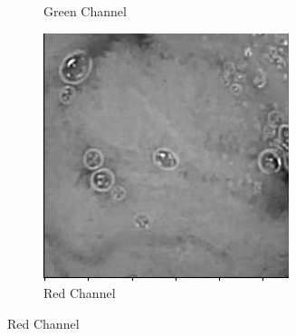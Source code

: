 \begin{figure}[H]
\begin{subfigure}[b]{0.3\textwidth}
    \caption{Green Channel}
  \end{subfigure}
  \begin{subfigure}[b]{0.3\textwidth}
    \includegraphics[width=\textwidth]{Chapter6/red_9.png}
    \caption{Red Channel}
  \end{subfigure}
  

\end{figure}
